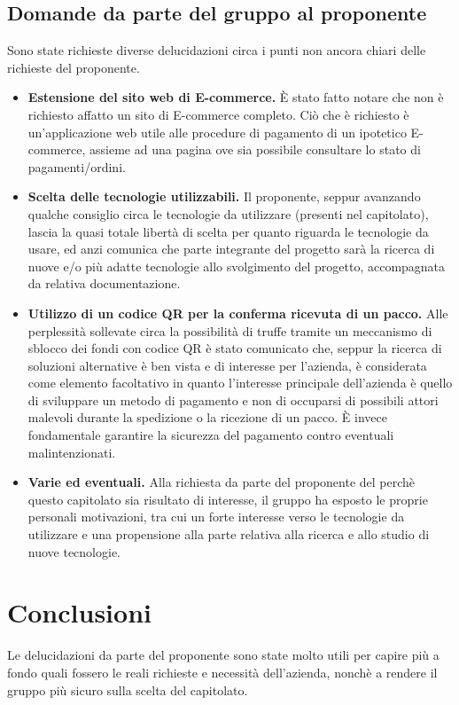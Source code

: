 \documentclass[a4paper, 12pt]{article}
\begin{document}
\subsection{Domande da parte del gruppo al proponente}
Sono state richieste diverse delucidazioni circa i punti non ancora chiari delle richieste del proponente.

\begin{itemize}
	\item \textbf{Estensione del sito web di E-commerce.} 
	È stato fatto notare che non è richiesto affatto un sito di E-commerce completo. Ciò che è richiesto è un'applicazione web utile alle procedure di pagamento di un ipotetico E-commerce, assieme ad una pagina ove sia possibile consultare lo stato di pagamenti/ordini.
	\item \textbf{Scelta delle tecnologie utilizzabili.} 
	Il proponente, seppur avanzando qualche consiglio circa le tecnologie da utilizzare (presenti nel capitolato), lascia la quasi totale libertà di scelta per quanto riguarda le tecnologie da usare, ed anzi comunica che parte integrante del progetto sarà la ricerca di nuove e/o più adatte tecnologie allo svolgimento del progetto, accompagnata da relativa documentazione.
	\item \textbf{Utilizzo di un codice QR per la conferma ricevuta di un pacco.}
	Alle perplessità sollevate circa la possibilità di truffe tramite un meccanismo di sblocco dei fondi con codice QR è stato comunicato che, seppur la ricerca di soluzioni alternative è ben vista e di interesse per l'azienda, è considerata come elemento facoltativo in quanto l'interesse principale dell'azienda è quello di sviluppare un metodo di pagamento e non di occuparsi di possibili attori malevoli durante la spedizione o la ricezione di un pacco. È invece fondamentale garantire la sicurezza del pagamento contro eventuali malintenzionati.
	\item \textbf{Varie ed eventuali.}
	Alla richiesta da parte del proponente del perchè questo capitolato sia risultato di interesse, il gruppo ha esposto le proprie personali motivazioni, tra cui un forte interesse verso le tecnologie da utilizzare e una propensione alla parte relativa alla ricerca e allo studio di nuove tecnologie.
\end{itemize}

\section{Conclusioni}
Le delucidazioni da parte del proponente sono state molto utili per capire più a fondo quali fossero le reali richieste e necessità dell'azienda, nonchè a rendere il gruppo più sicuro sulla scelta del capitolato.
\end{document}
